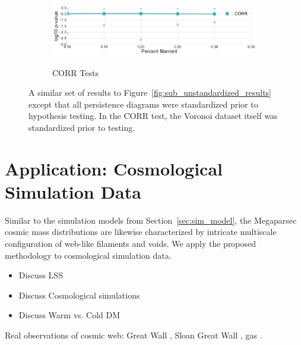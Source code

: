 \documentclass[12pt]{article}
\newcommand{\figref}[1]{Figure~\ref{#1}}
\begin{document}
\begin{center}
\begin{figure}[htp!]
\begin{subfigure}{.5\textwidth}
      \label{fig:sub_weight}
    \end{subfigure}
    \begin{subfigure}{.5\textwidth}
      \caption{CORR Tests}
      \includegraphics[width=\linewidth]{figure_8_correlation_group_normed.pdf}
      \label{fig:sub_corr}
    \end{subfigure}
  \caption{A similar set of results to \figref{fig:sub_unstandardized_results} except that all persistence diagrams were standardized prior to hypothesis testing. In the CORR test, the Voronoi dataset itself was standardized prior to testing.}
  \label{fig:sub_standardized_results}
  \end{figure}
\end{center}

\section{Application: Cosmological Simulation Data}
\label{sec:application}

Similar to the simulation models from Section~\ref{sec:sim_model}, the Megaparsec cosmic mass distributions are likewise characterized by intricate multiscale configuration of web-like filaments and voids. We apply the proposed methodology to cosmological simulation data.

{\color{red}
\begin{itemize}
\item  Discuss LSS
\item  Discuss Cosmological simulations
\item  Discuss Warm vs. Cold DM
\end{itemize}
Real observations of cosmic web:  Great Wall \citep{geller1989mapping}, Sloan Great Wall \citep{gott2005map}, gas \citep{cantalupo2014cosmic}.}
\end{document}
